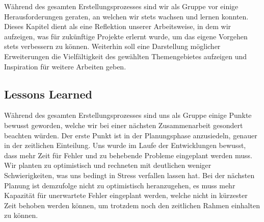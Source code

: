 Während des gesamten Erstellungsprozesses sind wir als Gruppe vor einige Herausforderungen geraten, an welchen wir stets wachsen und lernen konnten. Dieses Kapitel dient als eine Reflektion unserer Arbeitsweise, in dem wir aufzeigen, was für zukünftige Projekte erlernt wurde, um das eigene Vorgehen stets verbessern zu können. Weiterhin soll eine Darstellung möglicher Erweiterungen die Vielfältigkeit des gewählten Themengebietes aufzeigen und Inspiration für weitere Arbeiten geben.

\subsection{Lessons Learned}
\label{ssec:lessonslearned}
Während des gesamten Erstellungsprozesses sind uns als Gruppe einige Punkte bewusst geworden, welche wir bei einer nächsten Zusammenarbeit gesondert beachten würden. Der erste Punkt ist in der Planungsphase anzusiedeln, genauer in der zeitlichen Einteilung. Uns wurde im Laufe der Entwicklungen bewusst, dass mehr Zeit für Fehler und zu behebende Probleme eingeplant werden muss. Wir planten zu optimistisch und rechneten mit deutlichen weniger Schwierigkeiten, was uns bedingt in Stress verfallen lassen hat. Bei der nächsten Planung ist demzufolge nicht zu optimistisch heranzugehen, es muss mehr Kapazität für unerwartete Fehler eingeplant werden, welche nicht in kürzester Zeit behoben werden können, um trotzdem noch den zeitlichen Rahmen einhalten zu können.

